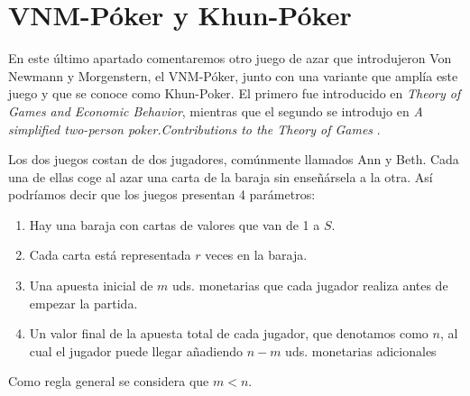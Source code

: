 \documentclass[12pt,a4paper,]{book}
\title{}
\author{Nombre Completo Autor}
\date{18/11/2021}
\def\ifdoblecara{} %
\def\ifprincipal{} %
\let\ifprincipal\undefined %
\numberwithin{dummy}{section}
\theoremstyle{ocrenumbox}
\theoremstyle{blacknumex}
\theoremstyle{blacknumbox}
\theoremstyle{ocrenum}
\theoremstyle{ocrenum}
\begin{document}




\raggedbottom

\ifdefined\ifprincipal
\else
\setlength{\parindent}{1em}
\pagestyle{fancy}
\setcounter{tocdepth}{4}
\tableofcontents

\fi

\ifdefined\ifdoblecara
\fancyhead{}{}
\fancyhead[LE,RO]{\scriptsize\rightmark}
\fancyfoot[LO,RE]{\scriptsize\slshape \leftmark}
\fancyfoot[C]{}
\fancyfoot[LE,RO]{\footnotesize\thepage}
\else
\fancyhead{}{}
\fancyhead[RO]{\scriptsize\rightmark}
\fancyfoot[LO]{\scriptsize\slshape \leftmark}
\fancyfoot[C]{}
\fancyfoot[RO]{\footnotesize\thepage}
\fi

\renewcommand{\headrulewidth}{0.4pt}
\renewcommand{\footrulewidth}{0.4pt}

\hypertarget{Seccion5}{%
\chapter{VNM-Póker y Khun-Póker}\label{Seccion5}}

En este último apartado comentaremos otro juego de azar que introdujeron
Von Newmann y Morgenstern, el VNM-Póker, junto con una variante que
amplía este juego y que se conoce como Khun-Poker. El primero fue
introducido en \emph{Theory of Games and Economic Behavior}, mientras
que el segundo se introdujo en \emph{A simplified two-person
poker.Contributions to the Theory of Games} .

Los dos juegos costan de dos jugadores, comúnmente llamados Ann y Beth.
Cada una de ellas coge al azar una carta de la baraja sin enseñársela a
la otra. Así podríamos decir que los juegos presentan 4 parámetros:

\begin{enumerate}
\def\labelenumi{\arabic{enumi}.}
\item
  Hay una baraja con cartas de valores que van de 1 a \(S\).
\item
  Cada carta está representada \(r\) veces en la baraja.
\item
  Una apuesta inicial de \(m\) uds. monetarias que cada jugador realiza
  antes de empezar la partida.
\item
  Un valor final de la apuesta total de cada jugador, que denotamos como
  \(n\), al cual el jugador puede llegar añadiendo \(n-m\) uds.
  monetarias adicionales
\end{enumerate}

Como regla general se considera que \(m<n\).
\end{document}
